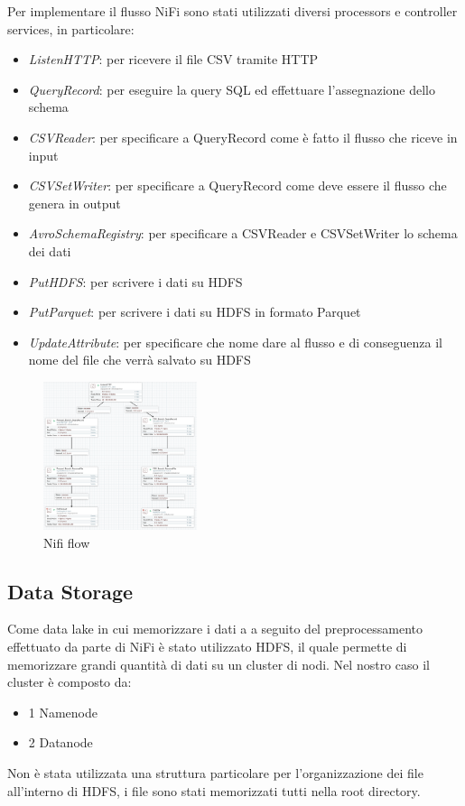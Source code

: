 \documentclass[conference]{IEEEtran}
\begin{document}
Per implementare il flusso NiFi sono stati utilizzati diversi processors e controller services, in particolare:
\begin{itemize}
    \item \textit{ListenHTTP}: per ricevere il file CSV tramite HTTP
    \item \textit{QueryRecord}: per eseguire la query SQL ed effettuare l'assegnazione dello schema
    \item \textit{CSVReader}: per specificare a QueryRecord come è fatto il flusso che riceve in input
    \item \textit{CSVSetWriter}: per specificare a QueryRecord come deve essere il flusso che genera in output
    \item \textit{AvroSchemaRegistry}: per specificare a CSVReader e CSVSetWriter lo schema dei dati
    \item \textit{PutHDFS}: per scrivere i dati su HDFS
    \item \textit{PutParquet}: per scrivere i dati su HDFS in formato Parquet
    \item \textit{UpdateAttribute}: per specificare che nome dare al flusso e di conseguenza il nome del file che verrà salvato su HDFS
\end{itemize}
\begin{figure}[H]
    \centering
    \includegraphics[width=0.4\textwidth]{./res/nifi_flow.png}
    \caption{Nifi flow}
    \label{fig:nifi_flow}
\end{figure} 
\subsection{Data Storage}
Come data lake in cui memorizzare i dati a a seguito del preprocessamento effettuato da parte di NiFi è stato utilizzato HDFS, il quale permette di memorizzare grandi quantità di dati su un cluster di nodi. Nel nostro caso il cluster è composto da:
\begin{itemize}
    \item 1 Namenode
    \item 2 Datanode
\end{itemize}
Non è stata utilizzata una struttura particolare per l'organizzazione dei file all'interno di HDFS, i file sono stati memorizzati tutti nella root directory.
\end{document}

